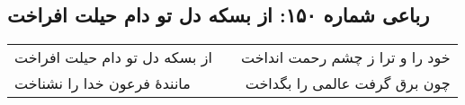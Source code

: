 \begin{center}
\section*{رباعی شماره ۱۵۰: از بسکه دل تو دام حیلت افراخت}
\label{sec:0150}
\begin{longtable}{l p{0.5cm} r}
از بسکه دل تو دام حیلت افراخت
&&
خود را و ترا ز چشم رحمت انداخت
\\
مانندهٔ فرعون خدا را نشناخت
&&
چون برق گرفت عالمی را بگداخت
\\
\end{longtable}
\end{center}
